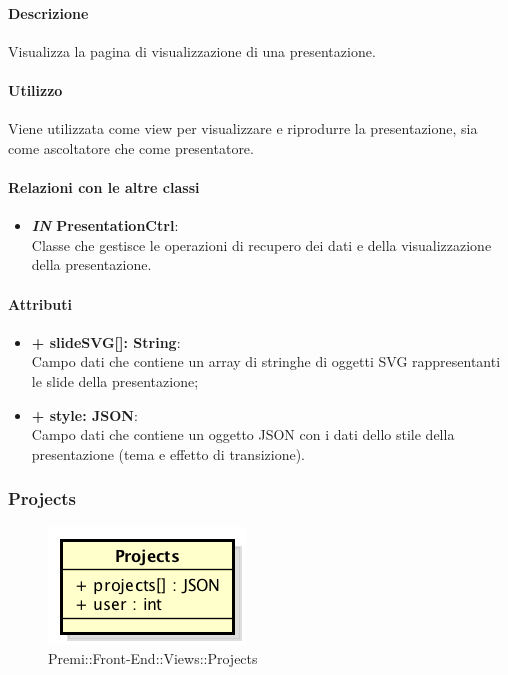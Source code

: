 	\paragraph{Descrizione}
	Visualizza la pagina di visualizzazione di una presentazione.
	
	\paragraph{Utilizzo}
	Viene utilizzata come view per visualizzare e riprodurre la presentazione, sia come ascoltatore che come presentatore.
	
	\paragraph{Relazioni con le altre classi}
	\begin{itemize}
		\item \textbf{\textit{IN} PresentationCtrl}:\\
			Classe che gestisce le operazioni di recupero dei dati e della visualizzazione della presentazione.
	\end{itemize}
	
	\paragraph{Attributi}
	\begin{itemize}
		\item \textbf{+ slideSVG[]: String}:\\
		Campo dati che contiene un array di stringhe di oggetti SVG rappresentanti le slide della presentazione;
		\item \textbf{+ style: JSON}: \\
		Campo dati che contiene un oggetto JSON con i dati dello stile della presentazione (tema e effetto di transizione).
	\end{itemize}
\newpage
	
	
\subsubsection{Projects}
	\begin{figure}[h]
		\centering
		\includegraphics[width=0.3\linewidth]{img/premi_front_end_views_projects}
		\caption[Premi::Front-End::Views::Projects]{Premi::Front-End::Views::Projects}
	\end{figure}
	
